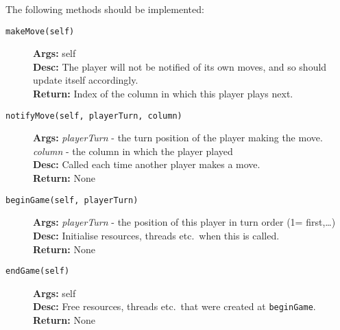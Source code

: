 \documentclass[a4paper,11pt]{article}
\newcommand{\MethodItem}[4]{\item[{\tt #1}]{\bf Args: }#2\\{\bf Desc: }#3\\{\bf Return: }#4}
\newcommand{\MethodArg}[2]{{\it #1} - #2}
\begin{document}
The following methods should be implemented:
\begin{description}
\MethodItem{makeMove(self)}{self}{The player will not be notified of its own moves, and so should update itself accordingly.}{Index of the column in which this player plays next.}
\MethodItem{notifyMove(self, playerTurn, column)}{\MethodArg{playerTurn}{the turn position of the player making the move.}\\\MethodArg{column}{the column in which the player played}}{Called each time another player makes a move.}{None}
\MethodItem{beginGame(self, playerTurn)}{\MethodArg{playerTurn}{the position of this player in turn order (1= first,\ldots)}}{Initialise resources, threads etc.\ when this is called.}{None}
\MethodItem{endGame(self)}{self}{Free resources, threads etc.\ that were created at {\tt beginGame}.}{None}
\end{description}
\end{document}
